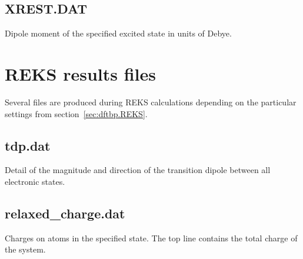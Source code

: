 \subsection{XREST.DAT}

Dipole moment of the specified excited state in units of Debye.

\section{REKS results files}
\label{sec:reks_files}
Several files are produced during REKS calculations depending on the
particular settings from section~\ref{sec:dftbp.REKS}.


\subsection{tdp.dat}

Detail of the magnitude and direction of the transition dipole between all electronic states.

\subsection{relaxed\_charge.dat}

Charges on atoms in the specified state. The top line contains the total charge of the system.

